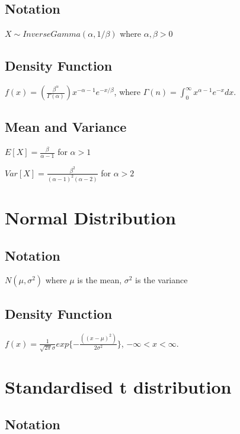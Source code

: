 \documentclass{article}
\begin{document}
\begin{multicols*}{3}
\subsection*{Notation}

$X \sim InverseGamma(\alpha, 1 / \beta)$ where $\alpha, \beta > 0$

\subsection*{Density Function}

$f(x) = (\frac{\beta^{\alpha}}{\Gamma(\alpha)}) x^{-\alpha-1} e^{-x / \beta}$, where $\Gamma(n) = \int^{\infty}_{0} x^{\alpha-1}e^{- x} dx$.

\subsection*{Mean and Variance}

$E[X] = \frac{\beta}{\alpha - 1}$ for $\alpha > 1$

$Var[X] = \frac{\beta^{2}}{(\alpha - 1)^{2}(\alpha - 2)}$ for $\alpha > 2$

\section{Normal Distribution}
\label{sec:normal-dist}

\subsection*{Notation}

$N(\mu,\sigma^2)$ where $\mu$ is the mean, $\sigma^{2}$ is the variance

\subsection*{Density Function}

$f(x) = \frac{1}{\sqrt{2\pi}\sigma}exp\{- \frac{((x - \mu)^2)}{2\sigma^2}\}$,
$- \infty < x < \infty$.

\section{Standardised t distribution}
\label{sec:t-dist}

\subsection*{Notation}


\end{multicols*}
\end{document}
